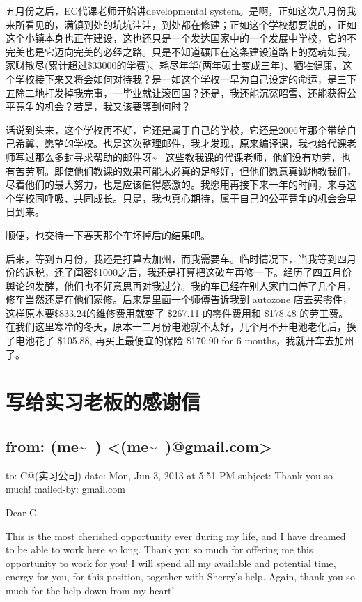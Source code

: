 \documentclass[12pt]{book}
\begin{document}
五月份之后，EC代课老师开始讲developmental system。是啊，正如这次八月份我来所看见的，满镇到处的坑坑洼洼，到处都在修建；正如这个学校想要说的，正如这个小镇本身也正在建设，这也还只是一个发达国家中的一个发展中学校，它的不完美也是它迈向完美的必经之路。只是不知道碾压在这条建设道路上的冤魂如我，家财散尽(累计超过\$33000的学费)、耗尽年华(两年硕士变成三年)、牺牲健康，这个学校接下来又将会如何对待我？是一如这个学校一早为自己设定的命运，是三下五除二地打发掉我完事，一毕业就让滚回国？还是，我还能沉冤昭雪、还能获得公平竟争的机会？若是，我又该要等到何时？

话说到头来，这个学校再不好，它还是属于自己的学校，它还是2006年那个带给自己希冀、愿望的学校。也是这次整理邮件，我才发现，原来编译课，我也给代课老师写过那么多封寻求帮助的邮件呀\textasciitilde{}~ 这些教我课的代课老师，他们没有功劳，也有苦劳啊。即使他们教课的效果可能未必真的足够好，但他们愿意真诚地教我们，尽着他们的最大努力，也是应该值得感激的。我愿用再接下来一年的时间，来与这个学校同呼吸、共同成长。只是，我也真心期待，属于自己的公平竞争的机会会早日到来。

顺便，也交待一下春天那个车坏掉后的结果吧。

后来，等到五月份，我还是打算去加州，而我需要车。临时情况下，当我等到四月份的退税，还了闺密\$1000之后，我还是打算把这破车再修一下。经历了四五月份舆论的发酵，他们也不好意思再对我过分。我的车已经在别人家门口停了几个月，修车当然还是在他们家修。后来是里面一个师傅告诉我到 autozone 店去买零件，这样原本要\$833.24的维修费用就变了 \$267.11 的零件费用和 \$178.48 的劳工费。在我们这里寒冷的冬天，原本一二月份电池就不太好，几个月不开电池老化后，换了电池花了 \$105.88, 再买上最便宜的保险 \$170.90 for 6 months，我就开车去加州了。

\chapter{写给实习老板的感谢信}
\label{sec-46}

\section{from:         (me\textasciitilde{}~) <(me\textasciitilde{}~)@gmail.com>}
\label{sec-46-1}
to:         C@(实习公司)
date:         Mon, Jun 3, 2013 at 5:51 PM
subject:         Thank you so much!
mailed-by:         gmail.com

Dear C,

This is the most cherished opportunity ever during my life, and I have dreamed to be able to work here so long. Thank you so much for offering me this opportunity to work for you! I will spend all my available and potential time, energy for you, for this position, together with Sherry's help.
Again, thank you so much for the help down from my heart!
\end{document}
